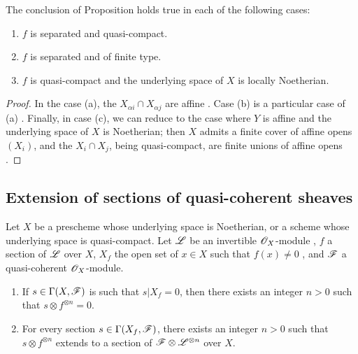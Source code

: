 \begin{cor}[9.2.2]
\label{1.9.2.2}
The conclusion of Proposition  holds true in each of the following cases:
\begin{enumerate}[label=\emph{(\alph*)}]
  \item $f$ is separated and quasi-compact.
  \item $f$ is separated and of finite type.
  \item $f$ is quasi-compact and the underlying space of $X$ is locally Noetherian.
\end{enumerate}
\end{cor}

\begin{proof}
\label{proof-1.9.2.2}
In the case (a), the $X_{\alpha i}\cap X_{\alpha j}$ are affine .
Case (b) is a particular case of (a) . Finally, in case (c), we can reduce to the case where $Y$ is affine and the underlying space of $X$ is Noetherian; then $X$ admits a finite cover of affine opens $(X_i)$, and the $X_i\cap X_j$, being quasi-compact, are finite unions of affine opens .
\end{proof}

\subsection{Extension of sections of quasi-coherent sheaves}
\label{subsection-extension-of-sections-of-qcoh}

\begin{thm}[9.3.1]
\label{1.9.3.1}
Let $X$ be a prescheme whose underlying space is Noetherian, or a scheme whose underlying
space is quasi-compact. Let $\mathscr{L}$ be an invertible $\mathscr{O}_X$-module , $f$ a
section of $\mathscr{L}$ over $X$, $X_f$ the open set of $x\in X$ such that $f(x)\neq0$
, and $\mathscr{F}$ a quasi-coherent $\mathscr{O}_X$-module.
\begin{enumerate}[label=\emph{(\roman*)}]
  \item If $s\in\Gamma(X,\mathscr{F})$ is such that $s|X_f=0$, then there exists an integer $n>0$ such that $s\otimes f^{\otimes n}=0$.
  \item For every section $s\in\Gamma(X_f,\mathscr{F})$, there exists an integer $n>0$ such that $s\otimes f^{\otimes n}$ extends to a section of $\mathscr{F}\otimes\mathscr{L}^{\otimes n}$ over $X$.
\end{enumerate}
\end{thm}

